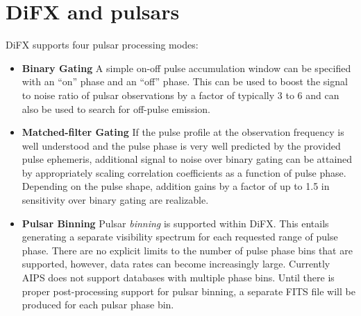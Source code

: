 \section{DiFX and pulsars} \label{sec:pulsars}





DiFX supports four pulsar processing modes:

\begin{itemize}

\item \label{psrmode:binarygate} {\bf Binary Gating}  
A simple on-off pulse accumulation window can be specified with an ``on'' phase and an ``off'' phase.
This can be used to boost the signal to noise ratio of pulsar observations by a factor of typically 3 to 6 and can also be used to search for off-pulse emission.

\item \label{psrmode:matchedgate} {\bf Matched-filter Gating}
If the pulse profile at the observation frequency is well understood and the pulse phase is very well predicted by the provided pulse ephemeris, additional signal to noise over binary gating can be attained by appropriately scaling correlation coefficients as a function of pulse phase.
Depending on the pulse shape, addition gains by a factor of up to 1.5 in sensitivity over binary gating are realizable.

\item \label{psrmode:bin} {\bf Pulsar Binning}
Pulsar {\em binning} is supported within DiFX.
This entails generating a separate visibility spectrum for each requested range of pulse phase.
There are no explicit limits to the number of pulse phase bins that are supported, however, data rates can become increasingly large.
Currently AIPS does not support databases with multiple phase bins. 
Until there is proper post-processing support for pulsar binning, a separate FITS file will be produced for each pulsar phase bin.


\end{itemize}
